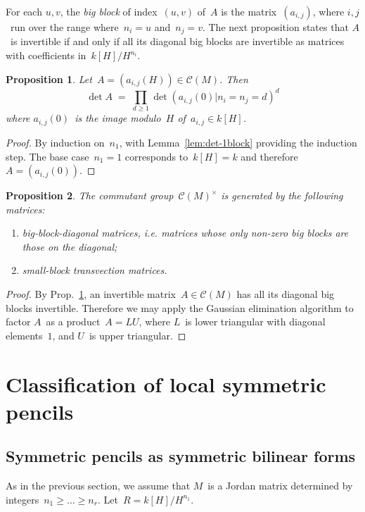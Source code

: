 \documentclass{article}%
\newtheorem{prop}{Proposition}
\let\ro\mathscr
\begin{document}
For each $u, v$, the \emph{big block} of index~$(u, v)$ of~$A$ is the
matrix~$(a_{i,j})$, where $i,j$~run over the range where~$n_i = u$
and~$n_j = v$. The next proposition states that $A$~is invertible if and
only if all its diagonal big blocks are invertible as matrices with
coefficients in~$k[H]/H^{n_i}$.

\begin{prop}\label{prop:det-bigblock}
Let~$A = (a_{i,j}(H)) ∈ \ro C(M)$. Then
\[ \det A \;=\; ∏_{d ≥ 1} \det (a_{i,j}(0) | n_{i} = n_j = d)^{d} \]
where $a_{i,j}(0)$~is the image modulo~$H$ of~$a_{i,j} ∈ k[H]$.
\end{prop}

\begin{proof}
By induction on~$n_1$, with Lemma~\ref{lem:det-1block} providing the
induction step. The base case~$n_1 = 1$ corresponds to~$k[H] = k$ and
therefore~$A = (a_{i,j}(0))$.
\end{proof}

\begin{prop}\label{prop:structure-gl}
The commutant group~$\ro C(M)^{×}$ is
generated by the following matrices:
\begin{enumerate}
\item big-block-diagonal matrices, i.e. matrices whose only non-zero big
blocks are those on the diagonal;
\item small-block transvection matrices.
\end{enumerate}
\end{prop}

\begin{proof}
By Prop.~\ref{prop:det-bigblock}, an invertible matrix~$A ∈ \ro C(M)$ has
all its diagonal big blocks invertible. Therefore we may apply the
Gaussian elimination algorithm to factor $A$~as a product~$A = LU$, where
$L$~is lower triangular with diagonal elements~$1$, and $U$~is upper
triangular.
\end{proof}

\section{Classification of local symmetric pencils}%
\subsection{Symmetric pencils as symmetric bilinear forms}%

As in the previous section, we assume that $M$~is a Jordan matrix
determined by integers~$n_1 ≥ … ≥ n_r$. Let~$R = k[H]/H^{n_1}$.
\end{document}
